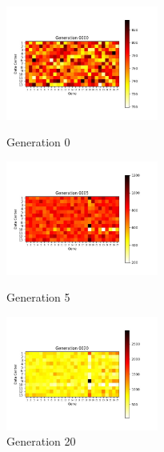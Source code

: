 \documentclass{llncs}
\begin{document}
\begin{figure}[htbp]
\centering
\begin{minipage}[t]{0.3\linewidth}
\centering
\includegraphics[width=5cm]{Figures/Generation 0000.jpg}
\caption{Generation 0}
\label{fig:g0}
\end{minipage}
\begin{minipage}[t]{0.3\linewidth}
\centering
\includegraphics[width=5cm]{Figures/Generation 0005.jpg}
\caption{Generation 5}
\label{fig:g5}
\end{minipage}
\begin{minipage}[t]{0.3\linewidth}
\centering
\includegraphics[width=5cm]{Figures/Generation 0020.jpg}
\caption{Generation 20}
\label{fig:g20}
\end{minipage}
\end{figure}
\end{document}
